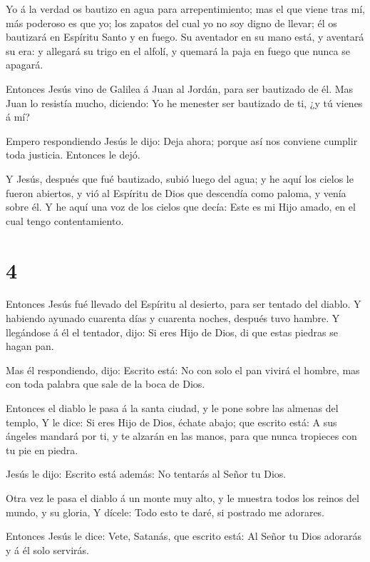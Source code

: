  Yo á la verdad os bautizo en agua para arrepentimiento;
mas el que viene tras mí, más poderoso es que yo; los zapatos del cual
yo no soy digno de llevar; él os bautizará en Espíritu Santo y en fuego.
 Su aventador en su mano está, y aventará su era: y
allegará su trigo en el alfolí, y quemará la paja en fuego que nunca se
apagará.

 Entonces Jesús vino de Galilea á Juan al Jordán, para ser
bautizado de él.  Mas Juan lo resistía mucho, diciendo: Yo
he menester ser bautizado de ti, ¿y tú vienes á mí?

 Empero respondiendo Jesús le dijo: Deja ahora; porque así
nos conviene cumplir toda justicia. Entonces le dejó.

 Y Jesús, después que fué bautizado, subió luego del agua;
y he aquí los cielos le fueron abiertos, y vió al Espíritu de Dios que
descendía como paloma, y venía sobre él.  Y he aquí una voz
de los cielos que decía: Este es mi Hijo amado, en el cual tengo
contentamiento.

\hypertarget{section-3}{%
\section{4}\label{section-3}}

 Entonces Jesús fué llevado del Espíritu al desierto, para
ser tentado del diablo.  Y habiendo ayunado cuarenta días y
cuarenta noches, después tuvo hambre.  Y llegándose á él el
tentador, dijo: Si eres Hijo de Dios, di que estas piedras se hagan pan.

 Mas él respondiendo, dijo: Escrito está: No con solo el pan
vivirá el hombre, mas con toda palabra que sale de la boca de Dios.

 Entonces el diablo le pasa á la santa ciudad, y le pone
sobre las almenas del templo,  Y le dice: Si eres Hijo de
Dios, échate abajo; que escrito está: A sus ángeles mandará por ti, y te
alzarán en las manos, para que nunca tropieces con tu pie en piedra.

 Jesús le dijo: Escrito está además: No tentarás al Señor tu
Dios.

 Otra vez le pasa el diablo á un monte muy alto, y le
muestra todos los reinos del mundo, y su gloria,  Y dícele:
Todo esto te daré, si postrado me adorares.

 Entonces Jesús le dice: Vete, Satanás, que escrito está:
Al Señor tu Dios adorarás y á él solo servirás.

